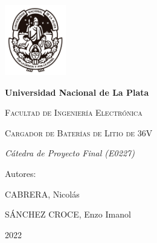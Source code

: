 \documentclass[12pt]{article}
\begin{document}
\begin{titlepage}
    \centering
    {\includegraphics[width=0.2\textwidth]{images/unlp-escudo.png}\par}
    \vspace{1cm}
    {\bfseries\LARGE Universidad Nacional de La Plata \par}
    \vspace{1cm}
    {\scshape\LARGE Facultad de Ingenier\'ia Electr\'onica \par}
    \vspace{3cm}
    {\scshape\Huge Cargador de Bater\'ias de Litio de 36V \par}
    \vspace{3cm}
    {\itshape\Large C\'atedra de Proyecto Final (E0227) \par}
    \vfill
    {\Large Autores: \par}
    {\Large CABRERA, Nicol\'as \par}
    {\Large S\'ANCHEZ CROCE, Enzo Imanol \par}
    \vfill
    {\Large 2022 \par}
\end{titlepage}
\thispagestyle{empty}
\newpage


\tableofcontents
\newpage


\printbibliography
\end{document}
